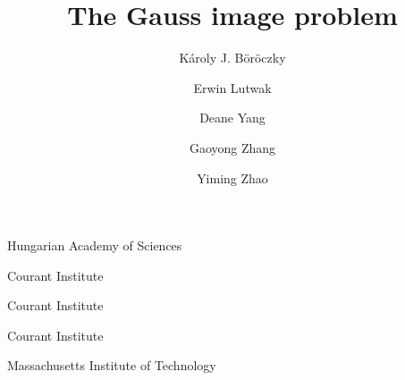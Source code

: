 \documentclass{cpamart1}     %
\theoremstyle{definition}
\theoremstyle{remark}
\begin{document}


\title{The Gauss image problem}

\author{K\'aroly J. B\"or\"oczky}{
 Hungarian Academy of Sciences}
\author{Erwin Lutwak}{Courant Institute}
\author{Deane Yang}{Courant Institute}
\author{Gaoyong Zhang}{Courant Institute}
\author{Yiming Zhao}{Massachusetts Institute of Technology}








\end{document}
